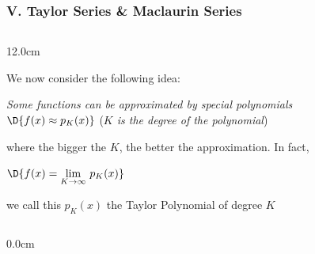 \begin{frame}
\frametitle{V. Taylor Series \& Maclaurin Series }
\scriptsize
\begin{columns}
\begin{column}{12.0cm}
\vspace{0.2cm}

We now consider the following idea: 

\begin{center}
	{\em Some functions can be approximated by special polynomials} \\
	\vspace{0.2cm}
	$\D{f(x)\approx p_K(x)}$ \quad ({\em $K$ is the degree of the polynomial})
\end{center}
where the bigger the $K$, the better the approximation.  In fact,
\begin{center}
	$\D{f(x) = \lim \limits_{K \to \infty}\,p_K(x)}$	
\end{center}
we call this $p_K(x)$ the Taylor Polynomial of degree $K$ \\

\vspace{0.2cm}

%
%
%

\begin{columns}\begin{column}{0.0cm}\end{column}\end{columns}


\end{column}
\end{columns}
\end{frame}
